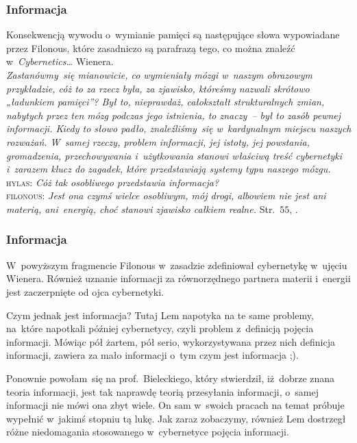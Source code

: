\documentclass[10pt,t]{beamer}
\begin{document}
\begin{frame}
  \frametitle{Informacja}


  Konsekwencją wywodu o~wymianie pamięci są następujące słowa wypowiadane
  przez Filonous, które zasadniczo są parafrazą tego, co można znaleźć
  w~\textit{Cybernetics\ldots} Wienera. \\
  \textit{Zastanówmy~się mianowicie, co wymieniały mózgi w~naszym obrazowym
    przykładzie, cóż to za rzecz była, za zjawisko, któreśmy nazwali
    skrótowo „ładunkiem pamięci”? Był to, nieprawdaż, całokształt
    strukturalnych zmian, nabytych przez ten mózg podczas jego istnienia,
    to znaczy~-- był to zasób pewnej informacji. Kiedy to słowo padło,
    znaleźliśmy~się w~kardynalnym miejscu naszych rozważań. W~samej rzeczy,
    problem informacji, jej istoty, jej powstania, gromadzenia,
    przechowywania i~użytkowania stanowi właściwą treść cybernetyki
    i~zarazem klucz do zagadek, które przedstawiają systemy typu naszego
    mózgu.} \\
  \textsc{hylas}: \textit{Cóż tak osobliwego przedstawia informacja?} \\
  \textsc{filonous}: \textit{Jest ona czymś wielce osobliwym, mój drogi,
    albowiem nie jest ani materią, ani~energią, choć stanowi zjawisko
    całkiem realne.} Str.~$55$, \parencite{Lem-Dialogi-Vol-I-Pub-1996}.

\end{frame}





\begin{frame}
  \frametitle{Informacja}


  W~powyższym fragmencie Filonous w~zasadzie zdefiniował cybernetykę
  w~ujęciu Wienera. Również uznanie informacji za równorzędnego partnera
  materii i~energii jest zaczerpnięte od ojca cybernetyki.

  Czym jednak jest informacja? Tutaj Lem napotyka na te same problemy,
  na~które napotkali później cybernetycy, czyli problem z~definicją pojęcia
  informacji. Mówiąc pół żartem, pół serio, wykorzystywana przez nich
  definicja informacji, zawiera za mało informacji o~tym czym jest
  informacja ;).

  Ponownie powołam~się na prof.~Bieleckiego, który stwierdził, iż~dobrze
  znana teoria informacji, jest tak naprawdę teorią \alert{przesyłania}
  informacji, o~samej informacji nie mówi ona zbyt wiele. On sam w~swoich
  pracach na temat
   próbuje wypełnić w~jakimś stopniu tą lukę. Jak zaraz
  zobaczymy, również Lem dostrzegł różne niedomagania stosowanego
  w~cybernetyce pojęcia informacji.

\end{frame}
\end{document}
